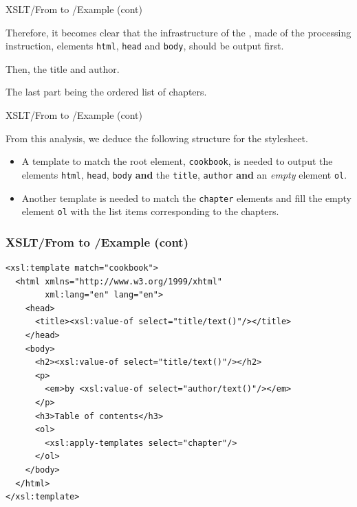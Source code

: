 %
\begin{frame}{XSLT/From \XML to \XHTML{}/Example (cont)}

Therefore, it becomes clear that the infrastructure of the \XHTML,
made of the \XML processing instruction, \XHTML elements
\texttt{html}, \texttt{head} and \texttt{body}, should be output
first.

\bigskip

Then, the title and author.

\bigskip

The last part being the ordered list of chapters.

\end{frame}

%
\begin{frame}{XSLT/From \XML to \XHTML{}/Example (cont)}

From this analysis, we deduce the following structure for the \XSLT
stylesheet.
\begin{itemize}

  \item A template to match the root element, \texttt{cookbook}, is
    needed to output the \XHTML elements \texttt{html}, \texttt{head},
    \texttt{body} \textbf{and} the \texttt{title}, \texttt{author}
    \textbf{and} an \emph{empty} \XHTML element \texttt{ol}.

  \item Another template is needed to match the \texttt{chapter}
    elements and fill the empty \XHTML element \texttt{ol} with the
    list items corresponding to the chapters.

\end{itemize}

\end{frame}

%
\begin{frame}[containsverbatim]
\frametitle{XSLT/From \XML to \XHTML{}/Example (cont)}

{\small
\begin{verbatim}
<xsl:template match="cookbook">
  <html xmlns="http://www.w3.org/1999/xhtml"
        xml:lang="en" lang="en">
    <head>
      <title><xsl:value-of select="title/text()"/></title>
    </head>
    <body>
      <h2><xsl:value-of select="title/text()"/></h2>
      <p>
        <em>by <xsl:value-of select="author/text()"/></em>
      </p>
      <h3>Table of contents</h3>
      <ol>
        <xsl:apply-templates select="chapter"/>
      </ol>
    </body>
  </html>
</xsl:template>
\end{verbatim}
}

\end{frame}


